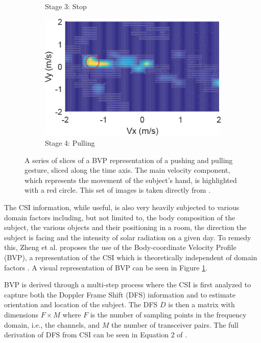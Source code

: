 \begin{figure}[t]
\begin{subfigure}{0.22\textwidth}
		\caption{Stage 3: Stop}
	\end{subfigure}
	\hfill
	\begin{subfigure}{0.22\textwidth}
		\centering
		\includegraphics[width=\textwidth]{figures/bvp_stage_4_pulling}
		\caption{Stage 4: Pulling}
	\end{subfigure}
	\caption{A series of slices of a BVP representation of a pushing and pulling gesture, sliced along the time axis. The main velocity component, which represents the movement of the subject's hand, is highlighted with a red circle. This set of images is taken directly from \cite{zheng2019zero}.}
	\label{fig:bvp-example}
\end{figure}

The CSI information, while useful, is also very heavily subjected to various domain factors including, but not limited to, the body composition of the subject, the various objects and their positioning in a room, the direction the subject is facing and the intensity of solar radiation on a given day.
To remedy this, Zheng et al. \cite{zheng2019zero} proposes the use of the Body-coordinate Velocity Profile (BVP), a representation of the CSI which is theoretically independent of domain factors \cite{zheng2019zero}.
A visual representation of BVP can be seen in Figure \ref{fig:bvp-example}.

BVP is derived through a multi-step process where the CSI is first analyzed to capture both the Doppler Frame Shift (DFS) information and to estimate orientation and location of the subject.
The DFS $D$ is then a matrix with dimensions $F \times M$ where $F$ is the number of sampling points in the frequency domain, i.e., the channels, and $M$ the number of transceiver pairs.
The full derivation of DFS from CSI can be seen in Equation 2 of \cite{zheng2019zero}.

